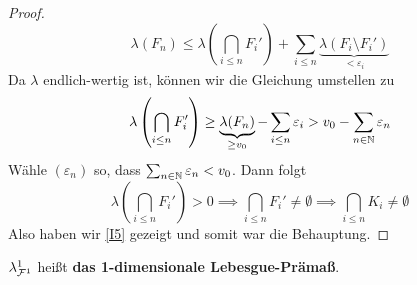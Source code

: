 \begin{satz}
\begin{proof}
$$
\lambda (F_n) \leq \lambda \left( \bigcap_{i\leq n} F_i' \right) + \sum_{i \leq n} \underbrace{\lambda (F_i \setminus F_i')}_{< \varepsilon_i}
$$
Da $\lambda$ endlich-wertig ist, können wir die Gleichung umstellen zu
$$
\lambda\left( \bigcap_{i \leq n} F_i' \right) \geq \underbrace{\lambda(F_n)}_{\geq v_0} - \sum_{i \leq n} \varepsilon_i > v_0 - \sum_{n \in \mathbb{N}} \varepsilon_n
$$
Wähle $(\varepsilon_n)$ so, dass $\sum_{n\in \mathbb{N}} \varepsilon_n < v_0$. Dann folgt
$$\lambda \left( \bigcap_{i \leq n } F_i' \right) > 0 \implies \bigcap_{i \leq n} F_i' \neq \emptyset \implies \bigcap_{i \leq n }K_i \neq \emptyset $$
Also haben wir \eqref{I5} gezeigt und somit war die Behauptung.
\end{proof}
\end{satz}

\begin{definition}
\begin{mdframed}
$\lambda^1_{\mathcal{F}^1}$ heißt \textbf{das 1-dimensionale Lebesgue-Prämaß}.
\end{mdframed}
\end{definition}

